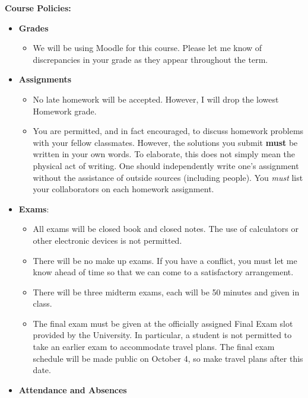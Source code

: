 \documentclass[11pt]{article}
\begin{document}
\textbf {\large Course Policies:}
\begin{itemize}
	\item \textbf {Grades}
		\begin{itemize}
			\item We will be using Moodle for this course. Please let me know of discrepancies in your grade as they appear throughout the term. 
		\end{itemize}
	\item \textbf {Assignments}
		\begin{itemize} 
			\item No late homework will be accepted. However, I will drop the lowest Homework grade. 
			\item You are permitted, and in fact encouraged, to discuss homework problems with your fellow classmates. However, the solutions you submit \textbf{must} be written in your own words. To elaborate, this does not simply mean the physical act of writing. One should independently write one's assignment without the assistance of outside sources (including people). You \emph{must} list your collaborators on each homework assignment. 
		\end{itemize}
	\item \textbf{Exams}:
			\begin{itemize}
				\item All exams will be closed book and closed notes. The use of calculators or other electronic devices is not permitted.
				\item There will be no make up exams. If you have a conflict, you must let me know ahead of time so that we can come to a satisfactory arrangement.
				\item There will be three midterm exams, each will be 50 minutes and given in class. 
				\item The final exam must be given at the officially assigned Final Exam slot provided by the University. In particular, a student is not permitted to take an earlier exam to accommodate travel plans. The final exam schedule will be made public on October 4, so make travel plans after this date. 
			\end{itemize}
	\item \textbf{Attendance and Absences}
		\begin{itemize}

\end{itemize}
\end{itemize}
\end{document}
